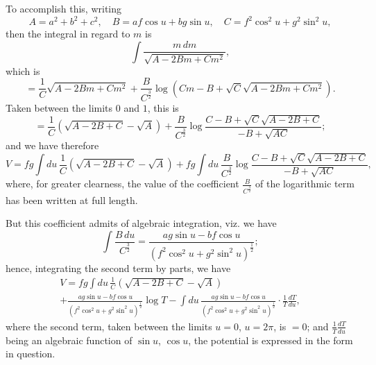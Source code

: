 \documentclass[11pt,a4paper]{book}
\begin{document}
\begin{art}
To accomplish this, writing
\[ A = a^2 + b^2 + c^2, \quad B = af\cos u + bg\sin u, \quad C = f^2\cos^2 u + g^2\sin^2 u, \]
then the integral in regard to $m$ is
\[
\int \frac{m\,dm}{\sqrt{A - 2Bm + Cm^2}},
\]
which is
\[
= \frac{1}{C}\sqrt{A - 2Bm + Cm^2} + \frac{B}{C^{\frac{3}{2}}}\log(Cm - B + \sqrt{C}\sqrt{A - 2Bm + Cm^2}).
\]
Taken between the limits $0$ and $1$, this is
\[
= \frac{1}{C}(\sqrt{A - 2B + C} - \sqrt{A}) + \frac{B}{C^{\frac{3}{2}}}\log\frac{C - B + \sqrt{C}\sqrt{A - 2B + C}}{-B + \sqrt{AC}};
\]
and we have therefore
\[
V = fg\int du\, \frac{1}{C}(\sqrt{A - 2B + C} - \sqrt{A}) + fg\int du\, \frac{B}{C^{\frac{3}{2}}}\log\frac{C - B + \sqrt{C}\sqrt{A - 2B + C}}{-B + \sqrt{AC}},
\]
where, for greater clearness, the value of the coefficient $\frac{B}{C^{\frac{3}{2}}}$ of the logarithmic term has been written at full length.
\end{art}

\begin{art}
But this coefficient admits of algebraic integration, viz. we have
\[
\int \frac{B\,du}{C^{\frac{3}{2}}}
= \frac{ag\sin u - bf\cos u}{(f^2\cos^2 u + g^2\sin^2 u)^{\frac{1}{2}}};
\]
hence, integrating the second term by parts, we have
\begin{multline*}
V = fg\int du\, \frac{1}{C}(\sqrt{A - 2B + C} - \sqrt{A}) \\
+ \frac{ag\sin u - bf\cos u}{(f^2\cos^2 u + g^2\sin^2 u)^{\frac{1}{2}}}\log T
- \int du\, \frac{ag\sin u - bf\cos u}{(f^2\cos^2 u + g^2\sin^2 u)^{\frac{1}{2}}} \cdot \frac{1}{T}\frac{dT}{du},
\end{multline*}
where the second term, taken between the limits $u=0$, $u=2\pi$, is $=0$; and $\frac{1}{T}\frac{dT}{du}$ being an algebraic function of $\sin u$, $\cos u$, the potential is expressed in the form in question.
\end{art}
\end{document}
